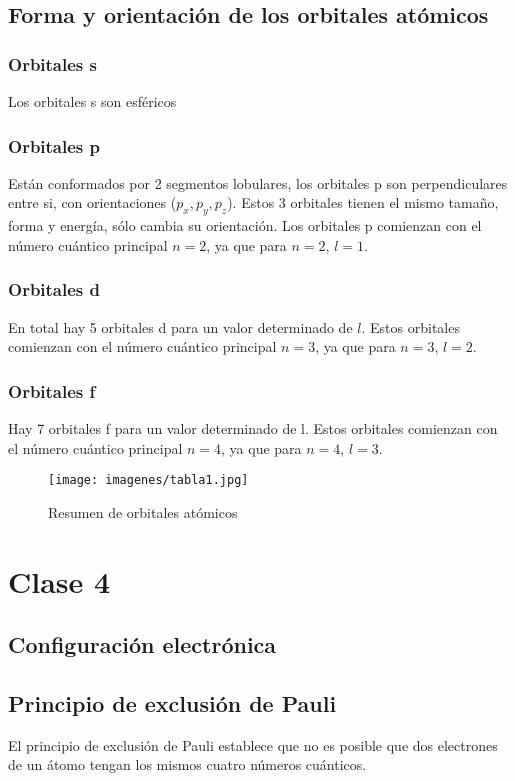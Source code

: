 \documentclass{article}
\begin{document}
\subsection{Forma y orientación de los orbitales atómicos}
\subsubsection{Orbitales s}
Los orbitales s son esféricos

\subsubsection{Orbitales p}
Están conformados por 2 segmentos lobulares, los orbitales p son perpendiculares entre si, con orientaciones ($p_x,p_y,p_z$). Estos 3 orbitales tienen el mismo tamaño, forma y energía, sólo cambia su orientación. Los orbitales p comienzan con el número cuántico principal $n=2$, ya que
para $n=2$, $l=1$.

\subsubsection{Orbitales d}
En total hay 5 orbitales d para un valor determinado de $l$. Estos orbitales comienzan con el número cuántico principal $n=3$, ya que para $n=3$, $l =2$.

\subsubsection{Orbitales f}
Hay 7 orbitales f para un valor determinado de l. Estos orbitales comienzan con el número cuántico principal $n=4$, ya que
para $n=4$, $l =3$.


\begin{figure}[h]
\caption{Resumen de orbitales atómicos}
\centering
\texttt{[image: imagenes/tabla1.jpg]}
\end{figure}

\section{Clase 4}
\subsection{Configuración electrónica}

\subsection{Principio de exclusión de Pauli}
El principio de exclusión de Pauli establece que no es posible que dos electrones de un átomo tengan los mismos cuatro números cuánticos.
\end{document}
